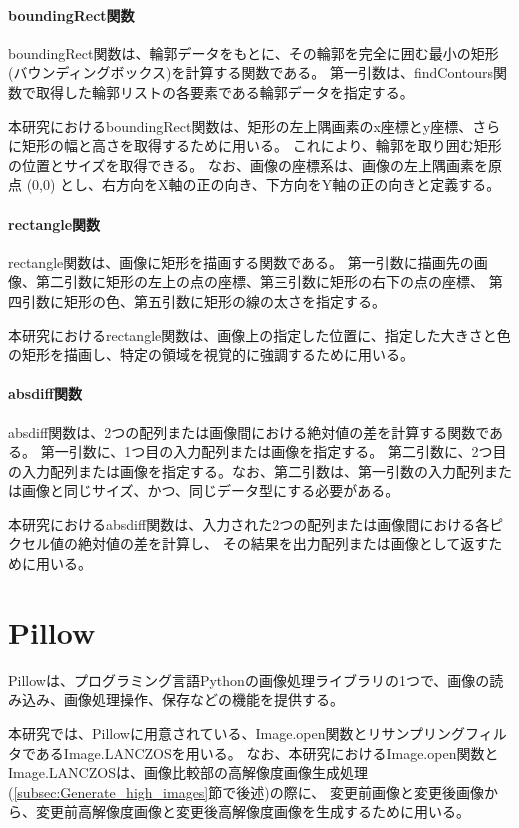 \paragraph{boundingRect関数}
boundingRect関数は、輪郭データをもとに、その輪郭を完全に囲む最小の矩形(バウンディングボックス)を計算する関数である。
第一引数は、findContours関数で取得した輪郭リストの各要素である輪郭データを指定する。
\par
本研究におけるboundingRect関数は、矩形の左上隅画素のx座標とy座標、さらに矩形の幅と高さを取得するために用いる。
これにより、輪郭を取り囲む矩形の位置とサイズを取得できる。
なお、画像の座標系は、画像の左上隅画素を原点 (0,0) とし、右方向をX軸の正の向き、下方向をY軸の正の向きと定義する。
\paragraph{rectangle関数}
rectangle関数は、画像に矩形を描画する関数である。
第一引数に描画先の画像、第二引数に矩形の左上の点の座標、第三引数に矩形の右下の点の座標、
第四引数に矩形の色、第五引数に矩形の線の太さを指定する。
\par
本研究におけるrectangle関数は、画像上の指定した位置に、指定した大きさと色の矩形を描画し、特定の領域を視覚的に強調するために用いる。
\paragraph{absdiff関数}
absdiff関数は、2つの配列または画像間における絶対値の差を計算する関数である。
第一引数に、1つ目の入力配列または画像を指定する。
第二引数に、2つ目の入力配列または画像を指定する。なお、第二引数は、第一引数の入力配列または画像と同じサイズ、かつ、同じデータ型にする必要がある。
\par
本研究におけるabsdiff関数は、入力された2つの配列または画像間における各ピクセル値の絶対値の差を計算し、
その結果を出力配列または画像として返すために用いる。

\section{Pillow}\label{sec:pillow}
Pillow\cite{Pillow}は、プログラミング言語Python\cite{Python}の画像処理ライブラリの1つで、画像の読み込み、画像処理操作、保存などの機能を提供する。
\par
本研究では、Pillowに用意されている、Image.open関数\cite{ImageModule}とリサンプリングフィルタであるImage.LANCZOS\cite{LANCZOS}を用いる。
なお、本研究におけるImage.open関数とImage.LANCZOSは、画像比較部の高解像度画像生成処理(\ref{subsec:Generate_high_images}節で後述)の際に、
変更前画像と変更後画像から、変更前高解像度画像と変更後高解像度画像を生成するために用いる。
